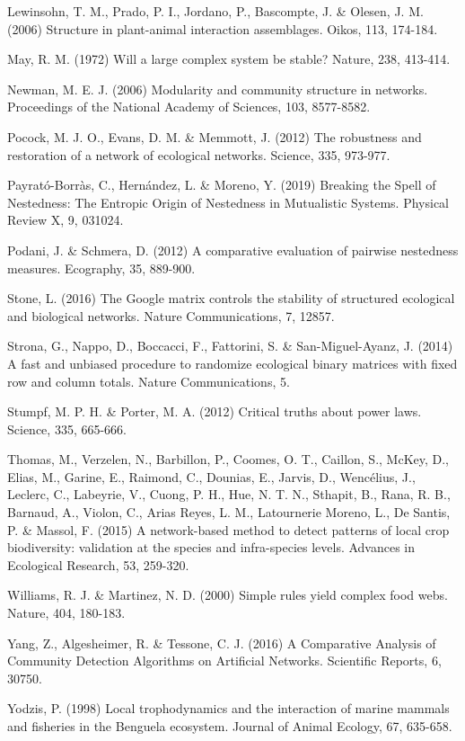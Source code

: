 \documentclass[
]{book}
\theoremstyle{definition}
\theoremstyle{definition}
\theoremstyle{definition}
\theoremstyle{definition}
\theoremstyle{remark}
\begin{document}
Lewinsohn, T. M., Prado, P. I., Jordano, P., Bascompte, J. \& Olesen, J. M. (2006) Structure in plant-animal interaction assemblages. Oikos, 113, 174-184.

May, R. M. (1972) Will a large complex system be stable? Nature, 238, 413-414.

Newman, M. E. J. (2006) Modularity and community structure in networks. Proceedings of the National Academy of Sciences, 103, 8577-8582.

Pocock, M. J. O., Evans, D. M. \& Memmott, J. (2012) The robustness and restoration of a network of ecological networks. Science, 335, 973-977.

Payrató-Borràs, C., Hernández, L. \& Moreno, Y. (2019) Breaking the Spell of Nestedness: The Entropic Origin of Nestedness in Mutualistic Systems. Physical Review X, 9, 031024.

Podani, J. \& Schmera, D. (2012) A comparative evaluation of pairwise nestedness measures. Ecography, 35, 889-900.

Stone, L. (2016) The Google matrix controls the stability of structured ecological and biological networks. Nature Communications, 7, 12857.

Strona, G., Nappo, D., Boccacci, F., Fattorini, S. \& San-Miguel-Ayanz, J. (2014) A fast and unbiased procedure to randomize ecological binary matrices with fixed row and column totals. Nature Communications, 5.

Stumpf, M. P. H. \& Porter, M. A. (2012) Critical truths about power laws. Science, 335, 665-666.

Thomas, M., Verzelen, N., Barbillon, P., Coomes, O. T., Caillon, S., McKey, D., Elias, M., Garine, E., Raimond, C., Dounias, E., Jarvis, D., Wencélius, J., Leclerc, C., Labeyrie, V., Cuong, P. H., Hue, N. T. N., Sthapit, B., Rana, R. B., Barnaud, A., Violon, C., Arias Reyes, L. M., Latournerie Moreno, L., De Santis, P. \& Massol, F. (2015) A network-based method to detect patterns of local crop biodiversity: validation at the species and infra-species levels. Advances in Ecological Research, 53, 259-320.

Williams, R. J. \& Martinez, N. D. (2000) Simple rules yield complex food webs. Nature, 404, 180-183.

Yang, Z., Algesheimer, R. \& Tessone, C. J. (2016) A Comparative Analysis of Community Detection Algorithms on Artificial Networks. Scientific Reports, 6, 30750.

Yodzis, P. (1998) Local trophodynamics and the interaction of marine mammals and fisheries in the Benguela ecosystem. Journal of Animal Ecology, 67, 635-658.

  
\end{document}
